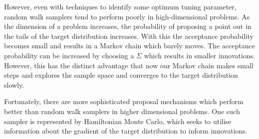 However, even with techniques to identify some optimum tuning parameter, random walk
samplers tend to perform poorly in high-dimensional problems. As the dimension of a
problem increases, the probability of proposing a point out in the tails of the target
distribution increases. With this the acceptance probability becomes small and
results in a Markov chain which barely moves. The acceptance probability can be increased
by choosing a $\Sigma$ which results in smaller innovations. However, this has the
distinct advantage that now our Markov chain makes small steps and explores the sample
space and converges to the target distribution slowly.

Fortunately, there are more sophisticated proposal mechanisms which perform better than
random walk samplers in higher dimensional problems. One such sampler is represented by
Hamiltonian Monte Carlo, which seeks to utilise information about the gradient of the
target distribution to inform innovations.

%
%
%
%

